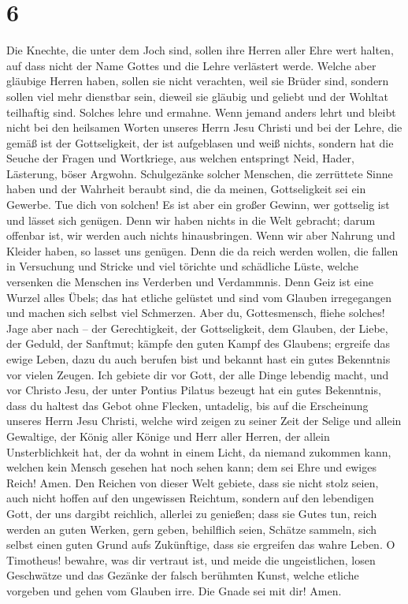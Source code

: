 \hypertarget{section-5}{%
\section{6}\label{section-5}}

 Die Knechte, die unter dem Joch sind, sollen ihre Herren
aller Ehre wert halten, auf dass nicht der Name Gottes und die Lehre
verlästert werde.  Welche aber gläubige Herren haben,
sollen sie nicht verachten, weil sie Brüder sind, sondern sollen viel
mehr dienstbar sein, dieweil sie gläubig und geliebt und der Wohltat
teilhaftig sind. Solches lehre und ermahne.  Wenn jemand
anders lehrt und bleibt nicht bei den heilsamen Worten unseres Herrn
Jesu Christi und bei der Lehre, die gemäß ist der Gottseligkeit,
 der ist aufgeblasen und weiß nichts, sondern hat die
Seuche der Fragen und Wortkriege, aus welchen entspringt Neid, Hader,
Lästerung, böser Argwohn.  Schulgezänke solcher Menschen,
die zerrüttete Sinne haben und der Wahrheit beraubt sind, die da meinen,
Gottseligkeit sei ein Gewerbe. Tue dich von solchen!  Es
ist aber ein großer Gewinn, wer gottselig ist und lässet sich genügen.
 Denn wir haben nichts in die Welt gebracht; darum
offenbar ist, wir werden auch nichts hinausbringen.  Wenn
wir aber Nahrung und Kleider haben, so lasset uns genügen.
 Denn die da reich werden wollen, die fallen in Versuchung
und Stricke und viel törichte und schädliche Lüste, welche versenken die
Menschen ins Verderben und Verdammnis.  Denn Geiz ist
eine Wurzel alles Übels; das hat etliche gelüstet und sind vom Glauben
irregegangen und machen sich selbst viel Schmerzen.  Aber
du, Gottesmensch, fliehe solches! Jage aber nach -- der Gerechtigkeit,
der Gottseligkeit, dem Glauben, der Liebe, der Geduld, der Sanftmut;
 kämpfe den guten Kampf des Glaubens; ergreife das ewige
Leben, dazu du auch berufen bist und bekannt hast ein gutes Bekenntnis
vor vielen Zeugen.  Ich gebiete dir vor Gott, der alle
Dinge lebendig macht, und vor Christo Jesu, der unter Pontius Pilatus
bezeugt hat ein gutes Bekenntnis,  dass du haltest das
Gebot ohne Flecken, untadelig, bis auf die Erscheinung unseres Herrn
Jesu Christi,  welche wird zeigen zu seiner Zeit der
Selige und allein Gewaltige, der König aller Könige und Herr aller
Herren,  der allein Unsterblichkeit hat, der da wohnt in
einem Licht, da niemand zukommen kann, welchen kein Mensch gesehen hat
noch sehen kann; dem sei Ehre und ewiges Reich! Amen. 
Den Reichen von dieser Welt gebiete, dass sie nicht stolz seien, auch
nicht hoffen auf den ungewissen Reichtum, sondern auf den lebendigen
Gott, der uns dargibt reichlich, allerlei zu genießen; 
dass sie Gutes tun, reich werden an guten Werken, gern geben, behilflich
seien,  Schätze sammeln, sich selbst einen guten Grund
aufs Zukünftige, dass sie ergreifen das wahre Leben.  O
Timotheus! bewahre, was dir vertraut ist, und meide die ungeistlichen,
losen Geschwätze und das Gezänke der falsch berühmten Kunst,
 welche etliche vorgeben und gehen vom Glauben irre. Die
Gnade sei mit dir! Amen.
